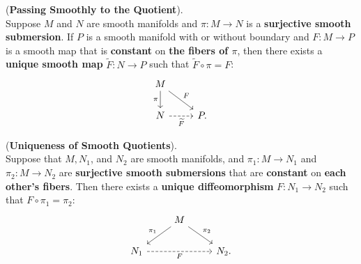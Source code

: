 \documentclass[11pt]{article}
\begin{document}
\begin{itemize}
\begin{theorem} (\textbf{Passing Smoothly to the Quotient}).\\
Suppose $M$ and $N$ are smooth manifolds and  $\pi: M \rightarrow N$  is a \textbf{surjective smooth submersion}. If $P$ is a
smooth manifold with or without boundary and $F: M \rightarrow P$ is a smooth map that is \textbf{constant} on \textbf{the fibers of $\pi$}, then there exists a \textbf{unique smooth map} $\widetilde{F}: N \rightarrow P$ such that $\widetilde{F} \circ \pi = F$:
\[
  \begin{tikzcd}
     M  \arrow[swap]{d}{\pi} \arrow[dr, "F"]  & \\
     N   \arrow[r, swap, dashed,  "\widetilde{F}"]  & P.
  \end{tikzcd}
\] 
\end{theorem}

\begin{theorem} (\textbf{Uniqueness of Smooth Quotients}). \\
Suppose that $M, N_1$, and $N_2$ are smooth manifolds, and $\pi_1: M \rightarrow N_1$ and $\pi_2: M \rightarrow N_2$ are \textbf{surjective smooth submersions} that are \textbf{constant} on \textbf{each other's fibers}. Then there exists a \textbf{unique diffeomorphism} $F: N_1 \rightarrow N_2$ such that $F\circ \pi_1 = \pi_2$:
\[
  \begin{tikzcd}
     & M  \arrow[swap]{dl}{\pi_1} \arrow[dr, "\pi_2"]  & \\
     N_1   \arrow[rr, swap, dashed,  "F"]  & & N_2.
  \end{tikzcd}
\] 
\end{theorem}
\end{itemize}
\end{document}
